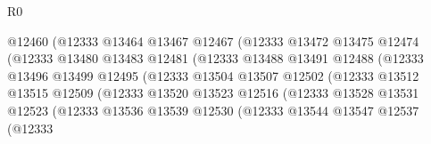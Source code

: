 \begin{lexlean}{R0}
\begin{coremodule}
                                      @12460
                                      (@12333
                                        @13464
                                        @13467
                                        @12467
                                        (@12333
                                          @13472
                                          @13475
                                          @12474
                                          (@12333
                                            @13480
                                            @13483
                                            @12481
                                            (@12333
                                              @13488
                                              @13491
                                              @12488
                                              (@12333
                                                @13496
                                                @13499
                                                @12495
                                                (@12333
                                                  @13504
                                                  @13507
                                                  @12502
                                                  (@12333
                                                    @13512
                                                    @13515
                                                    @12509
                                                    (@12333
                                                      @13520
                                                      @13523
                                                      @12516
                                                      (@12333
                                                        @13528
                                                        @13531
                                                        @12523
                                                        (@12333
                                                          @13536
                                                          @13539
                                                          @12530
                                                          (@12333
                                                            @13544
                                                            @13547
                                                            @12537
                                                            (@12333

\end{coremodule}
\end{lexlean}
